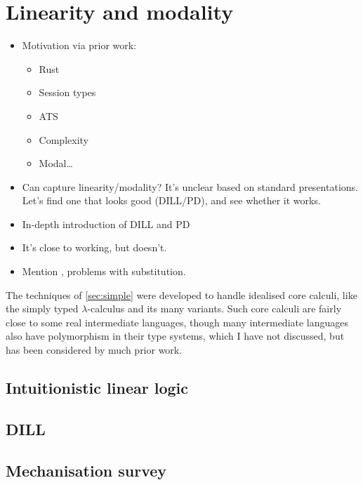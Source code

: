 \chapter{Linearity and modality}\label{sec:linearity}

\begin{itemize}
  \item Motivation via prior work:
    \begin{itemize}
      \item Rust
      \item Session types
      \item ATS
      \item Complexity \citep{Hofmann03}
      \item Modal\ldots
    \end{itemize}
  \item Can \citet{AACMM21} capture linearity/modality?
    It's unclear based on standard presentations.
    Let's find one that looks good (DILL/PD), and see whether it works.
  \item In-depth introduction of DILL and PD
  \item It's close to working, but doesn't.
  \item Mention \citet{BBdePH93}, problems with substitution.
\end{itemize}

The techniques of \cref{sec:simple} were developed to handle idealised core
calculi, like the simply typed $\lambda$-calculus and its many variants.
Such core calculi are fairly close to some real intermediate languages,
 though many intermediate languages also have polymorphism in their
type systems, which I have not discussed, but has been considered by much prior
work.


\section{Intuitionistic linear logic}\label{sec:ill}


\section{DILL}\label{sec:dill}


\section{Mechanisation survey}

